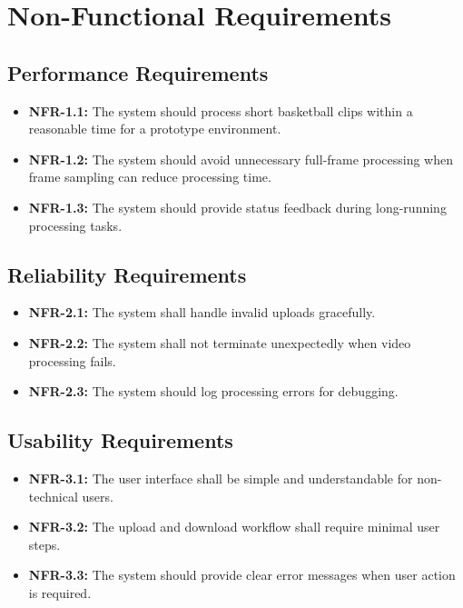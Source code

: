 \documentclass[12pt]{article}
\begin{document}
\newpage

\section{Non-Functional Requirements}

\subsection{Performance Requirements}
\begin{itemize}[noitemsep]
    \item \textbf{NFR-1.1:} The system should process short basketball clips within a reasonable time for a prototype environment.
    \item \textbf{NFR-1.2:} The system should avoid unnecessary full-frame processing when frame sampling can reduce processing time.
    \item \textbf{NFR-1.3:} The system should provide status feedback during long-running processing tasks.
\end{itemize}

\subsection{Reliability Requirements}
\begin{itemize}[noitemsep]
    \item \textbf{NFR-2.1:} The system shall handle invalid uploads gracefully.
    \item \textbf{NFR-2.2:} The system shall not terminate unexpectedly when video processing fails.
    \item \textbf{NFR-2.3:} The system should log processing errors for debugging.
\end{itemize}

\subsection{Usability Requirements}
\begin{itemize}[noitemsep]
    \item \textbf{NFR-3.1:} The user interface shall be simple and understandable for non-technical users.
    \item \textbf{NFR-3.2:} The upload and download workflow shall require minimal user steps.
    \item \textbf{NFR-3.3:} The system should provide clear error messages when user action is required.
\end{itemize}
\end{document}
